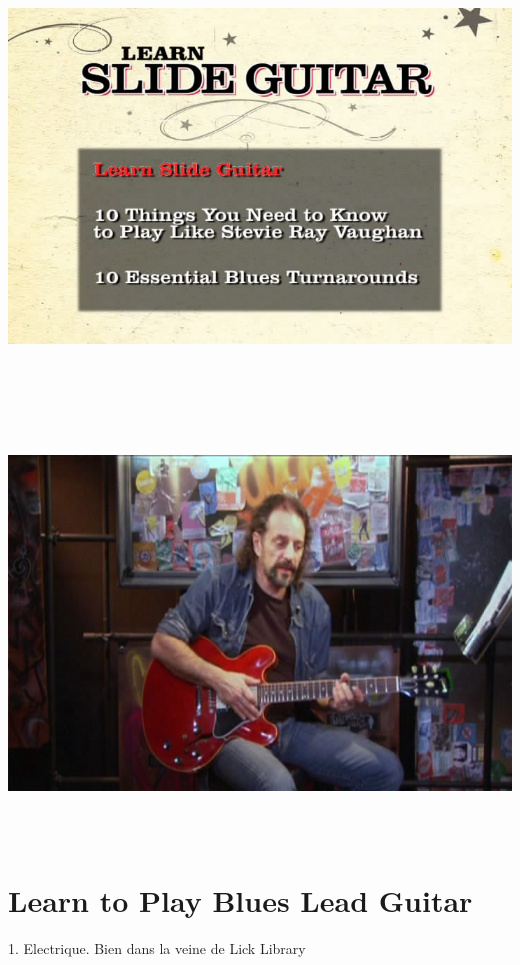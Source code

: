 \documentclass[a4paper]{book}
\begin{document}
\begin{center}
\includegraphics[width=17cm,height=11.333cm]{lebluessupportsmethodes-img129.jpg}
\end{center}
\begin{center}
\includegraphics[width=17cm,height=11.333cm]{lebluessupportsmethodes-img130.jpg}
\end{center}






\section[Learn to Play Blues Lead Guitar]{Learn to Play Blues Lead
Guitar}
\hypertarget{RefHeadingToc180973218262}{}1. Electrique. Bien dans la
veine de Lick Library
\end{document}
